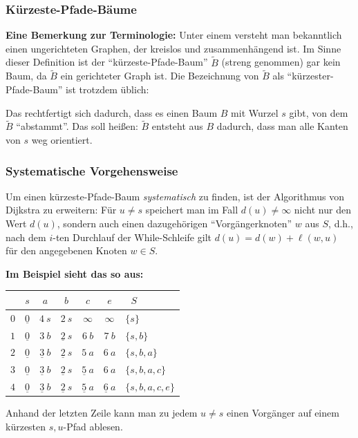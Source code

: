 \documentclass[smaller]{beamer}
\begin{document}
\begin{frame}
\frametitle{Kürzeste-Pfade-Bäume}
 \textbf{Eine Bemerkung zur Terminologie:} Unter einem  versteht man bekanntlich einen ungerichteten Graphen, der kreislos und zusammenhängend ist. Im Sinne dieser Definition ist der \enquote{kürzeste-Pfade-Baum} $\widetilde{B}$ (streng genommen) gar kein Baum, da $\widetilde{B}$ ein gerichteter Graph ist. Die Bezeichnung von $\widetilde{B}$ als \enquote{kürzester-Pfade-Baum} ist trotzdem üblich: \\ \vspace*{0.2cm}
 
 \alert{Das rechtfertigt sich dadurch, dass es einen Baum $B$ mit Wurzel $s$ gibt, von dem $\widetilde{B}$ \enquote{abstammt}. Das soll heißen: $\widetilde{B}$ entsteht aus $B$ dadurch, dass man alle Kanten von $s$ weg orientiert.}
\end{frame}

\begin{frame}
\frametitle{Systematische Vorgehensweise}
\alert{Um einen kürzeste-Pfade-Baum \textit{systematisch} zu finden, ist der Algorithmus von Dijkstra zu erweitern:} Für $u \neq s$ speichert man im Fall $d(u) \neq \infty$ nicht nur den Wert $d(u)$, sondern auch einen dazugehörigen \enquote{Vorgängerknoten} $w$ aus $S$, d.h., nach dem $i$-ten Durchlauf der While-Schleife gilt $d(u) = d(w) + \ell(w,u)$ für den angegebenen Knoten $w \in S$. \\ \vspace*{0.2cm}

\textbf{Im Beispiel sieht das so aus:}

\begin{center}
\begin{tabular}{c||c|c|c|c|c||l}
 & $s$ & $a$ & $b$ & $c$ & $e$ & \ $S$ \\ \hline\hline
$0$ & $\underline{0}$ & $4\ s$ & $2\ s$ & $\infty$ & $\infty$ & $\bigl\{ s \bigr\}$ \\ \hline
$1$ & $\underline{0}$ & $3\ b$ & $\underline{2}\ s$ & $6\ b$ & $7\ b$ & $\bigl\{ s,b \bigr\}$ \\ \hline
$2$ & $\underline{0}$ & $\underline{3}\ b$ & $\underline{2}\ s$ & $5\ a$ & $6\ a$ & $\bigl\{ s,b,a \bigr\}$ \\ \hline
$3$ & $\underline{0}$ & $\underline{3}\ b$ & $\underline{2}\ s$ & $\underline{5}\ a$ & $6\ a$ & $\bigl\{ s,b,a,c \bigr\}$ \\ \hline
$4$ & $\underline{0}$ & $\underline{3}\ b$ & $\underline{2}\ s$ & $\underline{5}\ a$ & $\underline{6}\ a$ & $\bigl\{ s,b,a,c,e \bigr\}$
\end{tabular}
\end{center}

Anhand der letzten Zeile kann man zu jedem $u \neq s$ einen Vorgänger auf einem kürzesten $s,u$-Pfad ablesen.
\end{frame}
\end{document}
